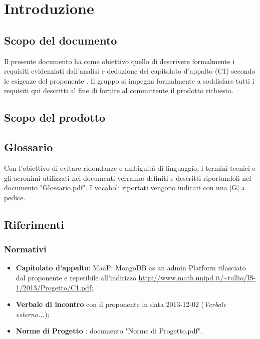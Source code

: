 \section{Introduzione}


\subsection{Scopo del documento}
Il presente documento ha come obiettivo quello di descrivere formalmente i requisiti evidenziati dall'analisi e deduzione del capitolato d'appalto \ProjectName{}  (C1) secondo le esigenze del proponente \Proponente{}. Il gruppo \GroupName{} si impegna formalmente a soddisfare tutti i requisiti qui descritti al fine di fornire al committente il prodotto richiesto.

\subsection{Scopo del prodotto} 
\ScopoDelProdotto

\subsection{Glossario}
Con l'obiettivo di evitare ridondanze e ambiguità di linguaggio, i termini tecnici e gli acronimi utilizzati nei documenti verranno definiti e descritti riportandoli nel documento "Glossario.pdf". I vocaboli riportati vengono indicati con una [G] a pedice.

\subsection{Riferimenti}
	\subsubsection{Normativi}
	\begin{itemize}
	\item \textbf{Capitolato d'appalto}: MaaP: MongoDB as an admin Platform rilasciato dal proponente
	\Proponente{} e reperibile all'indirizzo 
	\url{http://www.math.unipd.it/~tullio/IS-1/2013/Progetto/C1.pdf};
	\item \textbf{Verbale di incontro} con il proponente \Proponente{} in data 2013-12-02 (\textit{Verbale esterno...});
	\item \textbf{Norme di Progetto} : documento "Norme di Progetto.pdf". 
	\end{itemize}
	
